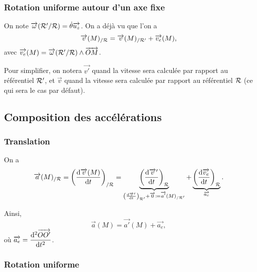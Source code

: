         \subsubsection{Rotation uniforme autour d'un axe fixe}

            On note $\protect\overrightarrow{{\omega}}(\mathcal{R}'/\mathcal{R})=\dot{\theta}\protect\overrightarrow{{u_z}}$. On a déjà vu que l'on a 
            \begin{equation*}
                \protect\overrightarrow{{v}}(M)_{/\mathcal{R}}=\protect\overrightarrow{{v}}(M)_{/\mathcal{R}'}+\protect\overrightarrow{{v_e}}(M),
            \end{equation*}
            avec $\protect\overrightarrow{{v_e}}(M)=\protect\overrightarrow{{\omega}}(\mathcal{R}'/\mathcal{R})\wedge\protect\overrightarrow{{OM}}$.

            Pour simplifier, on notera $\vec{v'}$ quand la vitesse sera calculée par rapport au référentiel $\mathcal{R}'$, et $\vec{v}$ quand la vitesse sera calculée par rapport au référentiel $\mathcal{R}$ (ce qui sera le cas par défaut).

    \subsection{Composition des accélérations}

        \subsubsection{Translation}

            On a
            \begin{equation*}
                \protect\overrightarrow{{a}}(M)_{/\mathcal{R}}=\left(\dfrac{\mathrm{d}\protect\overrightarrow{{v}}(M)}{\mathrm{d} t}\right)_{/\mathcal{R}}=
                \underbrace{\left(\frac{\mathrm{d}\protect\overrightarrow{{v}}'}{\mathrm{d} t}\right)_{\mathcal{R}}}_{\left(\frac{\mathrm{d}\protect\overrightarrow{{v}}'}{\mathrm{d} t}\right)_{\mathcal{R}'}+\protect\overrightarrow{{0}}\coloneqq\protect\overrightarrow{{a'}}(M)_{/\mathcal{R}'}}
                +\underbrace{\left(\frac{\mathrm{d}\protect\overrightarrow{{v_e}}}{\mathrm{d} t}\right)_{\mathcal{R}}}_{\protect\overrightarrow{{a_e}}}.
            \end{equation*}

            Ainsi,
            \begin{equation*}
                \boxed{
                    \vec{a}(M)=\vec{a'}(M)+\vec{a_e},
                }
            \end{equation*}
            où $\protect\overrightarrow{{a_e}}=\dfrac{\mathrm{d}^{2}\protect\overrightarrow{{OO'}}}{\mathrm{d} t^{2}}$.

        \subsubsection{Rotation uniforme}

